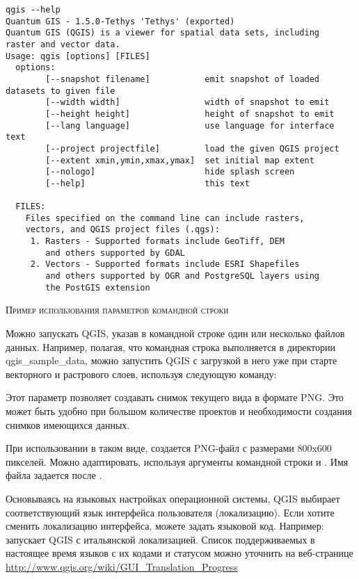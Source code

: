 \small
\begin{verbatim}
qgis --help
Quantum GIS - 1.5.0-Tethys 'Tethys' (exported)
Quantum GIS (QGIS) is a viewer for spatial data sets, including
raster and vector data.
Usage: qgis [options] [FILES]
  options:
        [--snapshot filename]           emit snapshot of loaded datasets to given file
        [--width width]                 width of snapshot to emit
        [--height height]               height of snapshot to emit
        [--lang language]               use language for interface text
        [--project projectfile]         load the given QGIS project
        [--extent xmin,ymin,xmax,ymax]  set initial map extent
        [--nologo]                      hide splash screen
        [--help]                        this text

  FILES:
    Files specified on the command line can include rasters,
    vectors, and QGIS project files (.qgs):
     1. Rasters - Supported formats include GeoTiff, DEM
        and others supported by GDAL
     2. Vectors - Supported formats include ESRI Shapefiles
        and others supported by OGR and PostgreSQL layers using
        the PostGIS extension
\end{verbatim}
\normalsize

\begin{Tip} \caption{\textsc{Пример использования параметров командной строки}}
Можно запускать QGIS, указав в командной строке один или несколько файлов данных. Например, полагая,
что командная строка выполняется в директории qgis\_sample\_data, можно запустить QGIS с загрузкой
в него уже при старте векторного и растрового слоев, используя следующую команду:
\end{Tip}

Этот параметр позволяет создавать снимок текущего вида в формате PNG. Это может быть удобно при
большом количестве проектов и необходимости создания снимков имеющихся данных.

При использовании в таком виде, создается PNG-файл с размерами 800x600 пикселей. Можно адаптировать, используя аргументы командной строки  и . Имя файла задается после .

Основываясь на языковых настройках операционной системы, QGIS выбирает соответствующий язык интерфейса пользователя (локализацию). Если хотите сменить локализацию интерфейса, можете задать языковой
код. Например:  запускает QGIS с итальянской локализацией. Список поддерживаемых в настоящее время языков с их кодами и статусом можно уточнить на веб-странице
\url{http://www.qgis.org/wiki/GUI_Translation_Progress}

